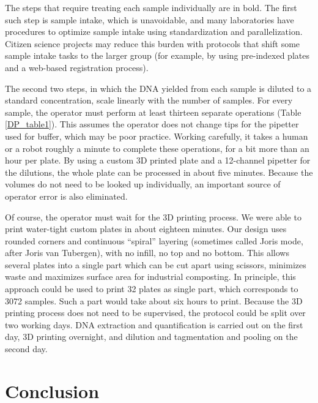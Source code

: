 \begin{refsection}
\noindent The steps that require treating each sample individually are in bold. The first such step is sample intake, which is unavoidable, and many laboratories have procedures to optimize sample intake using standardization and parallelization. Citizen science projects may reduce this burden with protocols that shift some sample intake tasks to the larger group (for example, by using pre-indexed plates and a web-based registration process). 

The second two steps, in which the DNA yielded from each sample is diluted to a standard concentration, scale linearly with the number of samples. For every sample, the operator must perform at least thirteen separate operations (Table \ref{DP_table1}). This assumes the operator does not change tips for the pipetter used for buffer, which may be poor practice. Working carefully, it takes a human or a robot roughly a minute to complete these operations, for a bit more than an hour per plate. By using a custom 3D printed plate and a 12-channel pipetter for the dilutions, the whole plate can be processed in about five minutes. Because the volumes do not need to be looked up individually, an important source of operator error is also eliminated.



Of course, the operator must wait for the 3D printing process. We were able to print water-tight custom plates in about eighteen minutes. Our design uses rounded corners and continuous ``spiral'' layering (sometimes called Joris mode, after Joris van Tubergen), with no infill, no top and no bottom. This allows several plates into a single part which can be cut apart using scissors, minimizes waste and maximizes surface area for industrial composting. In principle, this approach could be used to print 32 plates as single part, which corresponds to 3072 samples. Such a part would take about six hours to print. Because the 3D printing process does not need to be supervised, the protocol could be split over two working days. DNA extraction and quantification is carried out on the first day, 3D printing overnight, and dilution and tagmentation and pooling on the second day.

\section{Conclusion}


\end{refsection}
